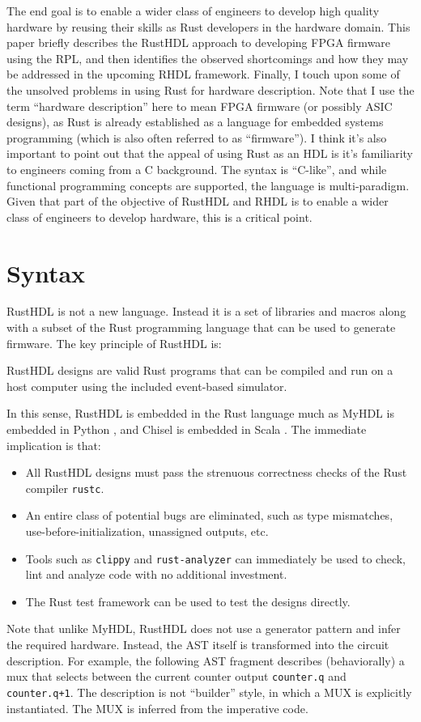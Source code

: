 \documentclass[sigplan,screen,sigconf]{acmart}
\begin{document}
The end goal is to enable a wider class of engineers to develop high quality hardware by reusing 
their skills as Rust developers in the hardware domain.  This paper briefly describes the RustHDL 
approach to developing FPGA firmware using the RPL, and then identifies the observed shortcomings
 and how they may be addressed in the upcoming RHDL framework.  Finally, I touch upon some of the
  unsolved problems in using Rust for hardware description.  Note that I use the term ``hardware description'' 
  here to mean FPGA firmware (or possibly ASIC designs), as Rust is already established as a language 
  for embedded systems programming (which is also often referred to as ``firmware''). 
I think it's also important to point out that the appeal of using Rust as an HDL is it's familiarity
 to engineers coming from a C background.  The syntax is ``C-like'', and
while functional programming concepts are supported, the language is multi-paradigm.  Given that part 
of the objective of RustHDL and RHDL is to enable a wider class of engineers to develop hardware, 
this is a critical point.

\section{Syntax}
RustHDL is not a new language.  Instead it is a set of libraries and macros along with a 
subset of the Rust programming language that can be used to generate firmware.  The key
principle of RustHDL is:

\begin{tcolorbox}
RustHDL designs are valid Rust programs that can be compiled and run on a host computer
using the included event-based simulator.
\end{tcolorbox}

In this sense, RustHDL is embedded in the Rust language much as MyHDL is embedded in Python \cite{b3},
and Chisel is embedded in Scala \cite{b2}.  The immediate implication is that:
\begin{itemize}
  \item All RustHDL designs must pass the strenuous correctness checks of the Rust compiler \verb|rustc|.
  \item An entire class of potential bugs are eliminated, such as type mismatches, use-before-initialization,
  unassigned outputs, etc.
  \item Tools such as \verb|clippy| and \verb|rust-analyzer| can immediately be used to
  check, lint and analyze code with no additional investment.
  \item The Rust test framework can be used to test the designs directly.
\end{itemize}
Note that unlike MyHDL, RustHDL does not use a generator pattern and infer the required hardware. 
 Instead, the AST itself is transformed into the circuit description.  For example, the following 
 AST fragment describes (behaviorally) a mux that selects between the current counter output 
 \verb|counter.q| and \verb|counter.q+1|.  The description is not ``builder'' style, in which a
  MUX is explicitly instantiated.  The MUX is inferred from the imperative code. 
\end{document}

